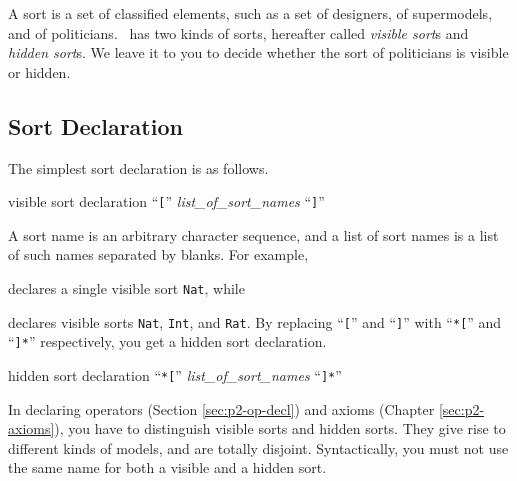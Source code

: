 \documentclass[a4paper]{memoir}
\begin{document}
A sort is a set of classified elements, such as
a set of designers, of supermodels, and of politicians.
\cafeobj~has two kinds of sorts, hereafter called {\em visible sort\/}s
and {\em hidden sort\/}s.
We leave it to you to decide whether the sort of politicians
is visible or hidden.

\subsection{Sort Declaration}\label{sec:p2-sort-decl-syntax}

The simplest sort declaration is as follows.

\begin{bsyntax} visible sort declaration
``\texttt{[}'' \textit{list\_of\_sort\_names} ``\texttt{]}''
\end{bsyntax}

A sort name is an arbitrary character sequence, and a list of sort names
is a list of such names separated by blanks. For example,
\begin{vvtm}
\begin{ccode}
  [ Nat ]
\end{ccode}
\end{vvtm}
declares a single visible sort \texttt{Nat}, while
\begin{vvtm}
\begin{ccode}
\end{ccode}
\end{vvtm}
declares visible sorts \texttt{Nat}, \texttt{Int}, and \texttt{Rat}.
By replacing ``\verb|[|'' and ``\verb|]|'' with ``\verb|*[|'' and
``\verb|]*|'' respectively, you get a hidden sort declaration.

\begin{bsyntax} hidden sort declaration \Hline
{}
``\texttt{*[}'' \textit{list\_of\_sort\_names} ``\texttt{]*}''
\end{bsyntax}

In declaring operators (Section \ref{sec:p2-op-decl}) and
axioms (Chapter \ref{sec:p2-axioms}), you have to
distinguish visible sorts and hidden sorts. They
give rise to different kinds of models, and are totally
disjoint. Syntactically, you must not use the same name for
both a visible and a hidden sort.
\end{document}
